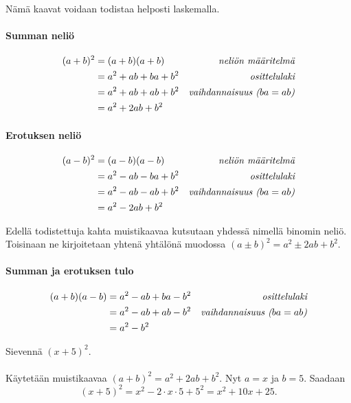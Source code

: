 Nämä kaavat voidaan todistaa helposti laskemalla.

\paragraph*{Summan neliö}

\begin{align*}
(a+b)^2 &= (a+b)(a+b) &\emph{neliön määritelmä} \\
&= a^2+ab+ba+b^2 &\emph{osittelulaki} \\
&= a^2+ab+ab+b^2 &\emph{vaihdannaisuus ($ba=ab$)} \\
&= a^2+2ab+b^2
\end{align*}

\paragraph*{Erotuksen neliö}

\begin{align*}
(a-b)^2 &= (a-b)(a-b) &\emph{neliön määritelmä} \\
&= a^2-ab-ba+b^2 &\emph{osittelulaki} \\
&= a^2-ab-ab+b^2 &\emph{vaihdannaisuus ($ba=ab$)} \\
&= a^2-2ab+b^2
\end{align*}

Edellä todistettuja kahta muistikaavaa kutsutaan yhdessä nimellä binomin neliö. Toisinaan ne kirjoitetaan yhtenä yhtälönä muodossa $(a \pm b)^2=a^2 \pm 2ab+b^2$. %

\paragraph*{Summan ja erotuksen tulo}

\begin{align*}
(a+b)(a-b) &= a^2-ab+ba-b^2 &\emph{osittelulaki} \\
&= a^2-ab+ab-b^2 &\emph{vaihdannaisuus ($ba=ab$)} \\
&= a^2-b^2
\end{align*}

\begin{esimerkki}
Sievennä $(x+5)^2$. \\
\quad\\
Käytetään muistikaavaa $(a+b)^2 = a^2+2ab+b^2$. Nyt $a = x$ ja $b = 5$.
Saadaan
        \[ (x+5)^2 = x^2-2\cdot x\cdot 5+5^2 = x^2+10x+25. \]
\end{esimerkki}

